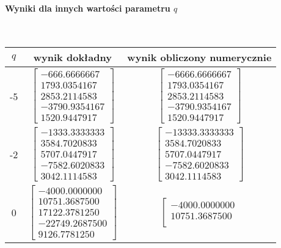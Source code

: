 \documentclass[a4paper]{article}
\begin{document}
\begin{table}[H]
\paragraph{Wyniki dla innych wartości parametru $q$} \hfill \\
\begin{tabular}{|c|c|c|}
\hline
$q$ & wynik dokładny & wynik obliczony numerycznie \\
\hline
-5 
& 
$$
\left[
\begin{array}{c}
-666.6666667\\ 
1793.0354167\\ 
2853.2114583\\ 
-3790.9354167\\ 
1520.9447917
\end{array}
\right]
$$
& 
$$
\left[
\begin{array}{c}
-6666.6666667\\ 
1793.0354167\\ 
2853.2114583\\ 
-3790.9354167\\ 
1520.9447917
\end{array}
\right]
$$ 
\\
\hline
-2 &
$$
\left[
\begin{array}{c}
-1333.3333333\\ 
3584.7020833\\ 
5707.0447917\\ 
-7582.6020833\\ 
3042.1114583
\end{array}
\right]
$$
& 
$$
\left[
\begin{array}{c}
-13333.3333333\\ 
3584.7020833\\ 
5707.0447917\\ 
-7582.6020833\\ 
3042.1114583
\end{array}
\right]
$$
\\
\hline
0 & 
$$
\left[
\begin{array}{c}
-4000.0000000\\ 
10751.3687500\\ 
17122.3781250\\ 
-22749.2687500\\ 
9126.7781250
\end{array}
\right]
$$ 
& 
$$
\left[
\begin{array}{c}
-4000.0000000\\ 
10751.3687500\\ 

\end{array}$$
\end{tabular}
\end{table}
\end{document}
